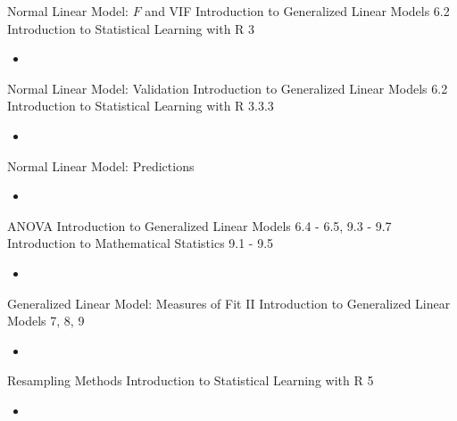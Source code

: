 \documentclass[12pt, titlepage, french]{report}
\begin{document}
\begin{CHPT_SUMM_AUTO_NUMB}[label = {L.-48}]{Normal Linear Model: $F$ and VIF}
Introduction to Generalized Linear Models 6.2
Introduction to Statistical Learning with R 3
	\begin{itemize}
		\item	
	\end{itemize}
\end{CHPT_SUMM_AUTO_NUMB}

\begin{CHPT_SUMM_AUTO_NUMB}[label = {L.-49}]{Normal Linear Model: Validation}
Introduction to Generalized Linear Models 6.2
Introduction to Statistical Learning with R 3.3.3
	\begin{itemize}
		\item	
	\end{itemize}
\end{CHPT_SUMM_AUTO_NUMB}

\begin{CHPT_SUMM_AUTO_NUMB}[label = {L.-50}]{Normal Linear Model: Predictions}
	\begin{itemize}
		\item	
	\end{itemize}
\end{CHPT_SUMM_AUTO_NUMB}

\begin{CHPT_SUMM_AUTO_NUMB}[label = {L.-51}]{ANOVA}
Introduction to Generalized Linear Models 6.4 - 6.5, 9.3 - 9.7
Introduction to Mathematical Statistics 9.1 - 9.5
	\begin{itemize}
		\item	
	\end{itemize}
\end{CHPT_SUMM_AUTO_NUMB}

\begin{CHPT_SUMM_AUTO_NUMB}[label = {L.-52}]{Generalized Linear Model: Measures of Fit II}
Introduction to Generalized Linear Models 7, 8, 9
	\begin{itemize}
		\item	
	\end{itemize}
\end{CHPT_SUMM_AUTO_NUMB}

\begin{CHPT_SUMM_AUTO_NUMB}[label = {L.-53}]{Resampling Methods}
Introduction to Statistical Learning with R 5
	\begin{itemize}
		\item	
	\end{itemize}
\end{CHPT_SUMM_AUTO_NUMB}
\end{document}
